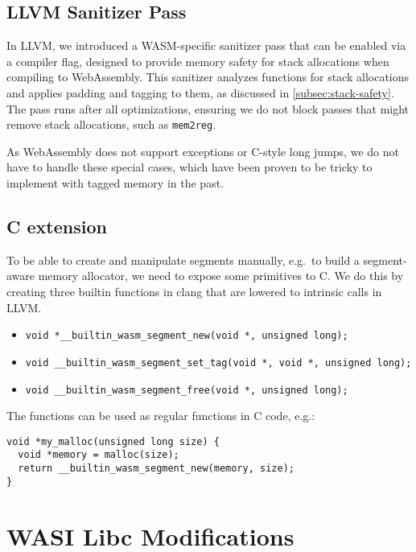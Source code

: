 \subsection{LLVM Sanitizer Pass}
\label{subsec:llvm-sanitizer-pass}

In LLVM, we introduced a WASM-specific sanitizer pass that can be enabled via a compiler flag, designed to provide memory safety for stack allocations when compiling to WebAssembly.
This sanitizer analyzes functions for stack allocations and applies padding and tagging to them, as discussed in \cref{subsec:stack-safety}.
The pass runs after all optimizations, ensuring we do not block passes that might remove stack allocations, such as \texttt{mem2reg}.

As WebAssembly does not support exceptions or C-style long jumps, we do not have to handle these special cases, which have been proven to be tricky to implement with tagged memory in the past.

\subsection{C extension}
\label{subsec:c-extension}

To be able to create and manipulate segments manually, e.g.\ to build a segment-aware memory allocator, we need to expose some primitives to C.
We do this by creating three builtin functions in clang that are lowered to intrinsic calls in LLVM.

\begin{itemize}
  \item \lstinline[style=customc]{void *__builtin_wasm_segment_new(void *, unsigned long);}
  \item \lstinline[style=customc]{void __builtin_wasm_segment_set_tag(void *, void *, unsigned long);}
  \item \lstinline[style=customc]{void __builtin_wasm_segment_free(void *, unsigned long);}
\end{itemize}

The functions can be used as regular functions in C code, e.g.:

\begin{lstlisting}[frame=h,style=customc,
  label={lst:builtin-functions}]
void *my_malloc(unsigned long size) {
  void *memory = malloc(size);
  return __builtin_wasm_segment_new(memory, size);
}
\end{lstlisting}

\section{WASI Libc Modifications}
\label{sec:wasi-libc}

